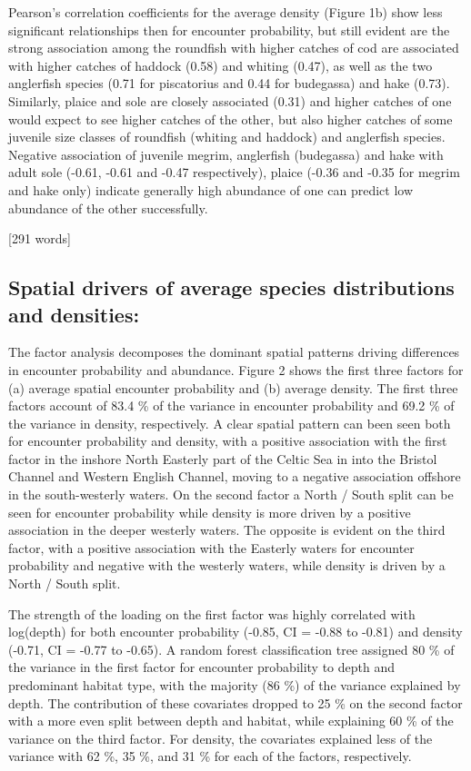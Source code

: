 \documentclass{nature}
\begin{document}
\begin{linenumbers}
Pearson's correlation coefficients for the average density (Figure 1b) show
less significant relationships then for encounter probability, but still
evident are the strong association among the roundfish with higher catches of
cod are associated with higher catches of haddock (0.58) and whiting (0.47), as
well as the two anglerfish species (0.71 for piscatorius and 0.44 for
budegassa) and hake (0.73). Similarly, plaice and sole are closely associated
(0.31) and higher catches of one would expect to see higher catches of the
other, but also higher catches of some juvenile size classes of roundfish
(whiting and haddock) and anglerfish species. Negative association of juvenile
megrim, anglerfish (budegassa) and hake with adult sole (-0.61, -0.61 and -0.47
respectively), plaice (-0.36 and -0.35 for megrim and hake only) indicate
generally high abundance of one can predict low abundance of the other
successfully.

[291 words]

\subsection{Spatial drivers of average species distributions and densities:}
The factor analysis decomposes the dominant spatial patterns driving
differences in encounter probability and abundance. Figure 2 shows the first
three factors for (a) average spatial encounter probability and (b) average
density. The first three factors account of 83.4 \% of the variance in
encounter probability and 69.2 \% of the variance in density, respectively. A
clear spatial pattern can been seen both for encounter probability and density,
with a positive association with the first factor in the inshore North Easterly
part of the Celtic Sea in into the Bristol Channel and Western English Channel,
moving to a negative association offshore in the south-westerly waters. On the
second factor a North / South split can be seen for encounter probability while
density is more driven by a positive association in the deeper westerly waters.
The opposite is evident on the third factor, with a positive association with
the Easterly waters for encounter probability and negative with the westerly
waters, while density is driven by a North / South split.

The strength of the loading on the first factor was highly correlated with
log(depth) for both encounter probability (-0.85, CI = -0.88 to -0.81) and
density (-0.71, CI = -0.77 to -0.65). A random forest classification tree
assigned 80 \% of the variance in the first factor for encounter probability to
depth and predominant habitat type, with the majority (86 \%) of the variance
explained by depth. The contribution of these covariates dropped to 25 \% on
the second factor with a more even split between depth and habitat, while
explaining 60 \% of the variance on the third factor. For density, the
covariates explained less of the variance with 62 \%, 35 \%, and 31 \% for each
of the factors, respectively.


\end{linenumbers}
\end{document}
